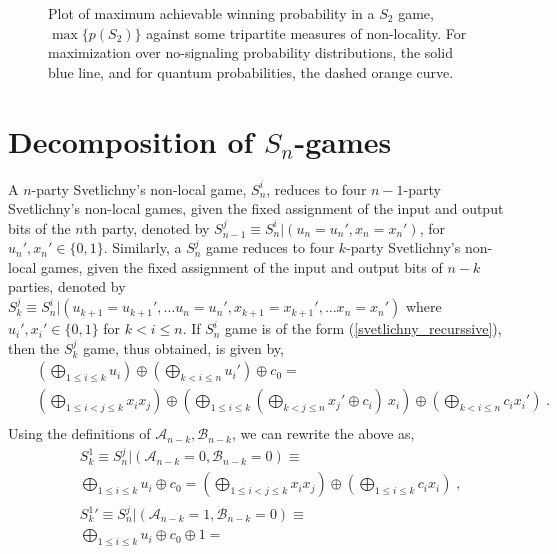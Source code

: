 \begin{widetext}
\begin{appendices}
\begin{figure}
{} \hfill
\caption{Plot of maximum achievable winning probability in a $S_2$ game, $\max \{p(S_2)\}$ against some tripartite measures of non-locality. For maximization over no-signaling probability distributions, the solid blue line, and for quantum probabilities, the dashed orange curve.
}
\label{myTableSucks}
\end{figure}

 
\section{Decomposition of $S_n$-games}
\label{svet_prop}
\noindent A $n$-party Svetlichny's non-local game, $S_n^i$, reduces to four $n-1$-party Svetlichny's non-local games, given the fixed assignment of the input and output bits of the $n$th party, denoted by $S_{n-1}^j\equiv S_n^i|(u_n=u_n',x_n=x_n')$, for  $u_n',x_n' \in \{0,1\}$. Similarly, a $S_n^j$ game reduces to four $k$-party Svetlichny's non-local games, given the fixed assignment of the input and output bits of $n-k$ parties, denoted by $S_{k}^j\equiv S_n^i|(u_{k+1}=u_{k+1}',\ldots u_n=u_n',x_{k+1}=x_{k+1}',\ldots x_n=x_n')$ where $u_i',x_i'\in \{0,1\}$ for $k < i \le n$. If $S_n^i$ game is of the form (\ref{svetlichny_recurssive}), then the $S_{k}^j$ game, thus obtained, is given by,
\begin{eqnarray}
\label{svetlichny_in_any_lower_form}
&&(\bigoplus_{1\le i \le k}u_i) \oplus (\bigoplus_{k < i \le n}u_i{'}) \oplus c_0 ={}\nonumber\\&&
(\bigoplus_{1\le i<j \le k}x_i x_j) \oplus
 (\bigoplus_{1 \le i \le k} (\bigoplus_{k<j\le n}x_{j}{'} \oplus c_i ) \ x_i) \oplus
 (\bigoplus_{k<i \le n}c_ix_i{'}) \; . {}\nonumber\\&&  
\end{eqnarray} 
Using the definitions of $\mathcal{A}_{n-k},\mathcal{B}_{n-k}$, we can rewrite the above as,
\begin{eqnarray}
\label{svetlichny_k_00}
&& S_k^1 \equiv S_{n}^j|( \mathcal{A}_{n-k}=0,\mathcal{B}_{n-k}=0) \equiv  {}\nonumber\\&&
\bigoplus_{1 \le i\le k} u_i \oplus c_0 = 
(\bigoplus_{1 \le i<j \le k} x_i x_j) \oplus (\bigoplus_{1 \le i\le k}c_i x_i) {} \; ,\nonumber\\&& 
{S_k^1}' \equiv S_{n}^j|(\mathcal{A}_{n-k}=1,\mathcal{B}_{n-k}=0) \equiv {}\nonumber\\&&  
\bigoplus_{1 \le i\le k} u_i \oplus c_0 \oplus 1 = 

\end{eqnarray}
\end{appendices}
\end{widetext}
